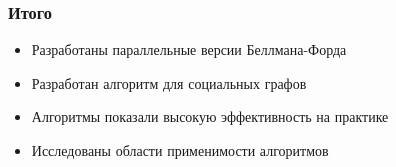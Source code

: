\documentclass[10pt, compress]{beamer}
\begin{document}
\begin{frame}[fragile]
  \frametitle{Итого}
  \begin{itemize}
    \item Разработаны параллельные версии Беллмана-Форда 
    \item Разработан алгоритм для социальных графов
    \item Алгоритмы показали высокую эффективность на практике
    \item Исследованы области применимости алгоритмов
  \end{itemize}
\end{frame}
\end{document}
